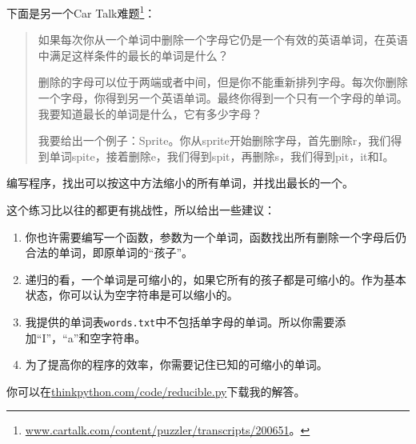 \begin{ex}


下面是另一个Car Talk难题\footnote{\url{www.cartalk.com/content/puzzler/transcripts/200651}。}：

\begin{quote}
如果每次你从一个单词中删除一个字母它仍是一个有效的英语单词，在英语中满足这样条件的最长的单词是什么？

删除的字母可以位于两端或者中间，但是你不能重新排列字母。每次你删除一个字母，你得到另一个英语单词。最终你得到一个只有一个字母的单词。我要知道最长的单词是什么，它有多少字母？

我要给出一个例子：Sprite。你从sprite开始删除字母，首先删除r，我们得到单词spite，接着删除e，我们得到spit，再删除s，我们得到pit，it和I。
\end{quote}


编写程序，找出可以按这中方法缩小的所有单词，并找出最长的一个。

这个练习比以往的都更有挑战性，所以给出一些建议：

\begin{enumerate}

\item 你也许需要编写一个函数，参数为一个单词，函数找出所有删除一个字母后仍合法的单词，即原单词的“孩子”。


\item 递归的看，一个单词是可缩小的，如果它所有的孩子都是可缩小的。作为基本状态，你可以认为空字符串是可以缩小的。

\item 我提供的单词表{\tt words.txt}中不包括单字母的单词。所以你需要添加“I”，“a”和空字符串。

\item 为了提高你的程序的效率，你需要记住已知的可缩小的单词。

\end{enumerate}

你可以在\url{thinkpython.com/code/reducible.py}下载我的解答。

\end{ex}
